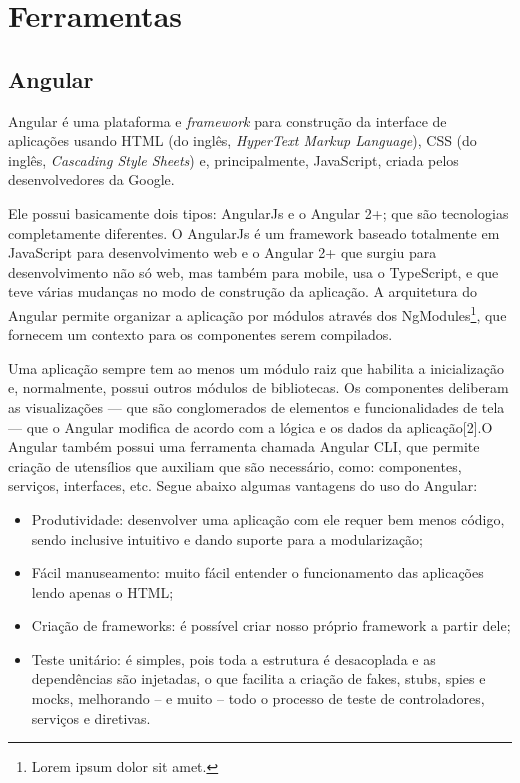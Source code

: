 \section{Ferramentas}

\subsection{Angular}
Angular \cite{afonso2018angular} é uma plataforma e \textit{framework} para construção da interface de aplicações usando HTML (do inglês, \textit{HyperText Markup Language}), CSS (do inglês, \textit{Cascading Style Sheets}) e, principalmente, JavaScript, criada pelos desenvolvedores da Google. 

Ele possui basicamente dois tipos: AngularJs e o Angular 2+; que são tecnologias completamente diferentes. O AngularJs é um framework baseado totalmente em JavaScript para desenvolvimento web e o Angular 2+ que surgiu para desenvolvimento não só web, mas também para mobile, usa o TypeScript, e que teve várias mudanças no modo de construção da aplicação. A arquitetura do Angular permite organizar a aplicação por módulos através dos NgModules\footnote{Lorem ipsum dolor sit amet.}, que fornecem um contexto para os componentes serem compilados. 

Uma aplicação sempre tem ao menos um módulo raiz que habilita a inicialização e, normalmente, possui outros módulos de bibliotecas. Os componentes deliberam as visualizações — que são conglomerados de elementos e funcionalidades de tela — que o Angular modifica de acordo com a lógica e os dados da aplicação[2].O Angular também possui uma ferramenta chamada Angular CLI, que permite criação de utensílios que auxiliam que são necessário, como: componentes, serviços, interfaces, etc. Segue abaixo algumas vantagens do uso do Angular:  

\begin{itemize}
    \item Produtividade: desenvolver uma aplicação com ele requer bem menos código, sendo inclusive intuitivo e dando suporte para a modularização; 
    \item Fácil manuseamento: muito fácil entender o funcionamento das aplicações lendo apenas o HTML;   
    \item Criação de frameworks: é possível criar nosso próprio framework a partir dele;   
    \item Teste unitário: é simples, pois toda a estrutura é desacoplada e as dependências são injetadas, o que facilita a criação de fakes, stubs, spies e mocks, melhorando – e muito – todo o processo de teste de controladores, serviços e diretivas. 
\end{itemize}

